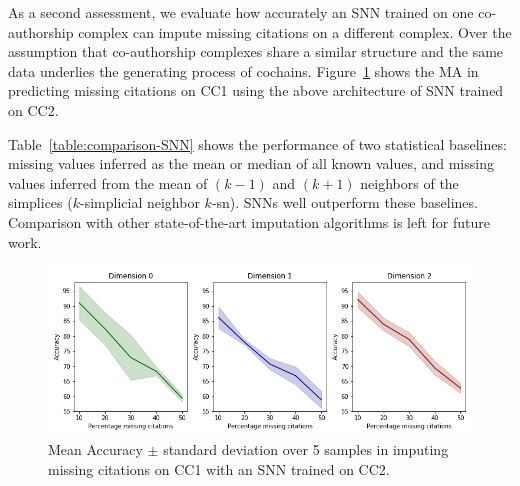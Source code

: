 As a second assessment, we evaluate how accurately an SNN trained on one co-authorship complex can impute missing citations on a different complex. Over the assumption that co-authorship complexes share a similar structure and the same data underlies the generating process of cochains.
Figure~\ref{fig:transfer-learning} shows the MA in predicting missing citations on CC1 using the above architecture of SNN trained on CC2.

Table~\ref{table:comparison-SNN} shows the performance of two statistical baselines: missing values inferred as the mean or median of all known values, and missing values inferred from the mean of $(k-1)$ and $(k+1)$ neighbors of the simplices ($k$-simplicial neighbor $k$-sn). SNNs well outperform these baselines.
Comparison with other state-of-the-art imputation algorithms is left for future work.

\begin{figure}[htbp]
  \centering
\includegraphics[scale=0.35]{./figures/accuracy_network1_pretrained.png}
  \caption{Mean Accuracy $\pm$ standard deviation over 5 samples in imputing missing citations on CC1 with an SNN trained on CC2.} \label{fig:transfer-learning}
\end{figure}

